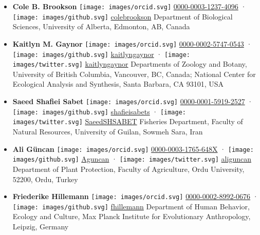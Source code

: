 \begin{itemize}
\item
  \textbf{Cole B. Brookson}
  \texttt{[image: images/orcid.svg]}
  \href{https://orcid.org/0000-0003-1237-4096}{0000-0003-1237-4096}
  · \texttt{[image: images/github.svg]}
  \href{https://github.com/colebrookson}{colebrookson}
  Department of Biological Sciences, University of Alberta, Edmonton, AB, Canada
\item
  \textbf{Kaitlyn M. Gaynor}
  \texttt{[image: images/orcid.svg]}
  \href{https://orcid.org/0000-0002-5747-0543}{0000-0002-5747-0543}
  · \texttt{[image: images/github.svg]}
  \href{https://github.com/kaitlyngaynor}{kaitlyngaynor}
  · \texttt{[image: images/twitter.svg]}
  \href{https://twitter.com/kaitlyngaynor}{kaitlyngaynor}
  Departments of Zoology and Botany, University of British Columbia, Vancouver, BC, Canada; National Center for Ecological Analysis and Synthesis, Santa Barbara, CA 93101, USA
\item
  \textbf{Saeed Shafiei Sabet}
  \texttt{[image: images/orcid.svg]}
  \href{https://orcid.org/0000-0001-5919-2527}{0000-0001-5919-2527}
  · \texttt{[image: images/github.svg]}
  \href{https://github.com/shafieisabets}{shafieisabets}
  · \texttt{[image: images/twitter.svg]}
  \href{https://twitter.com/SaeedSHSABET}{SaeedSHSABET}
  Fisheries Department, Faculty of Natural Resources, University of Guilan, Sowmeh Sara, Iran
\item
  \textbf{Ali Güncan}
  \texttt{[image: images/orcid.svg]}
  \href{https://orcid.org/0000-0003-1765-648X}{0000-0003-1765-648X}
  · \texttt{[image: images/github.svg]}
  \href{https://github.com/Aguncan}{Aguncan}
  · \texttt{[image: images/twitter.svg]}
  \href{https://twitter.com/aliguncan}{aliguncan}
  Department of Plant Protection, Faculty of Agriculture, Ordu University, 52200, Ordu, Turkey
\item
  \textbf{Friederike Hillemann}
  \texttt{[image: images/orcid.svg]}
  \href{https://orcid.org/0000-0002-8992-0676}{0000-0002-8992-0676}
  · \texttt{[image: images/github.svg]}
  \href{https://github.com/fhillemann}{fhillemann}
  Department of Human Behavior, Ecology and Culture, Max Planck Institute for Evolutionary Anthropology, Leipzig, Germany

\end{itemize}
